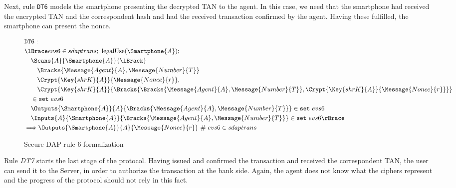 Next, rule \texttt{DT6} models the smartphone presenting the decrypted TAN to the agent. In this case, we need that the smartphone had received the encrypted TAN and the correspondent hash and had the received transaction confirmed by the agent. Having these fulfilled, the smartphone can present the nonce.

\begin{figure}[!h]
  \begin{align*}
    & \texttt{DT6}: \newline \\
    & \lBrace evs6 \in sdaptrans;\ \text{legalUse}(\Smartphone{A}); \\
    & \quad \Scans{A}{\Smartphone{A}}{\lBrack} \\
    & \qquad \Bracks{\Message{Agent}{A}, \Message{Number}{T}} \\
    & \qquad \Crypt{\Key{shrK}{A}}{\Message{Nonce}{r}}, \\
    & \qquad \Crypt{\Key{shrK}{A}}{\Bracks{\Bracks{\Message{Agent}{A}, \Message{Number}{T}}, \Crypt{\Key{shrK}{A}}{\Message{Nonce}{r}}}} \\
    & \quad \in \texttt{set} \ evs6 \\
    & \quad \Outputs{\Smartphone{A}}{A}{\Bracks{\Message{Agent}{A}, \Message{Number}{T}}} \in \texttt{set} \ evs6 \\
    & \quad \Inputs{A}{\Smartphone{A}}{\Bracks{\Message{Agent}{A}, \Message{Number}{T}}} \in \texttt{set} \ evs6 \rBrace \\ 
    & \Longrightarrow \Outputs{\Smartphone{A}}{A}{\Message{Nonce}{r}} \ \# \ evs6 \in sdaptrans
  \end{align*}
  \label{fig:dap-model-6}
  \caption{Secure DAP rule 6 formalization}
\end{figure}

Rule \textit{DT7} starts the last stage of the protocol. Having issued and confirmed the transaction and received the correspondent TAN, the user can send it to the Server, in order to authorize the transaction at the bank side. Again, the agent does not know what the ciphers represent and the progress of the protocol should not rely in this fact.

